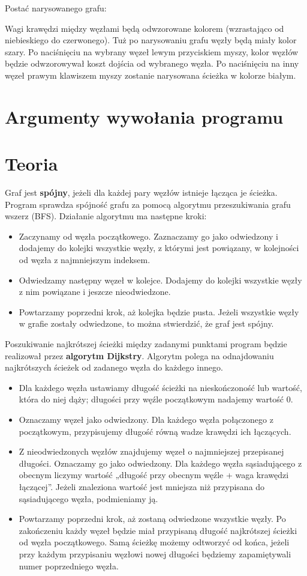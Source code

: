 \documentclass[]{article}
\begin{document}
Postać narysowanego grafu:

Wagi krawędzi między węzłami będą odwzorowane kolorem (wzrastająco od niebieskiego do czerwonego). Tuż po narysowaniu grafu węzły będą miały kolor szary. Po naciśnięciu na wybrany węzeł lewym przyciskiem myszy, kolor węzłów będzie odwzorowywał koszt dojścia od wybranego węzła. Po naciśnięciu na inny węzeł prawym klawiszem myszy zostanie narysowana ścieżka w kolorze białym.

\section{Argumenty wywołania programu}\label{header-n256}

\section{Teoria}\label{header-n279}

Graf jest \textbf{spójny}, jeżeli dla każdej pary węzłów istnieje łącząca je ścieżka. Program sprawdza spójność grafu za pomocą algorytmu przeszukiwania grafu wszerz (BFS). Działanie algorytmu ma następne kroki:
\begin{itemize}
\item
  Zaczynamy od węzła początkowego. Zaznaczamy go jako odwiedzony i dodajemy do kolejki wszystkie węzły, z którymi jest powiązany, w kolejności od węzła z najmniejszym indeksem.
\item
  Odwiedzamy następny węzeł w kolejce. Dodajemy do kolejki wszystkie węzły z nim powiązane i jeszcze nieodwiedzone.
\item
  Powtarzamy poprzedni krok, aż kolejka będzie pusta. Jeżeli wszystkie węzły w grafie zostały odwiedzone, to można stwierdzić, że graf jest spójny.
\end{itemize}

Poszukiwanie najkrótszej ścieżki między zadanymi punktami program będzie realizował przez \textbf{algorytm Dijkstry}. Algorytm polega na odnajdowaniu najkrótszych ścieżek od zadanego węzła do każdego innego. 
\begin{itemize}
\item
  Dla każdego węzła ustawiamy długość ścieżki na nieskończoność lub wartość, która do niej dąży; długości przy węźle początkowym nadajemy wartość 0. 
\item
  Oznaczamy węzeł jako odwiedzony. Dla każdego węzła połączonego z początkowym, przypisujemy długość równą wadze krawędzi ich łączących.
\item
  Z nieodwiedzonych węzłów znajdujemy węzeł o najmniejszej przepisanej długości. Oznaczamy go jako odwiedzony. Dla każdego węzła sąsiadującego z obecnym liczymy wartość „długość przy obecnym węźle + waga krawędzi łączącej”. Jeżeli znaleziona wartość jest mniejsza niż przypisana do sąsiadującego węzła, podmieniamy ją.
\item
  Powtarzamy poprzedni krok, aż zostaną odwiedzone wszystkie węzły. Po zakończeniu każdy węzeł będzie miał przypisaną długość najkrótszej ścieżki od węzła początkowego. Samą ścieżkę możemy odtworzyć od końca, jeżeli przy każdym przypisaniu węzłowi nowej długości będziemy zapamiętywali numer poprzedniego węzła.
\end{itemize}
\end{document}
